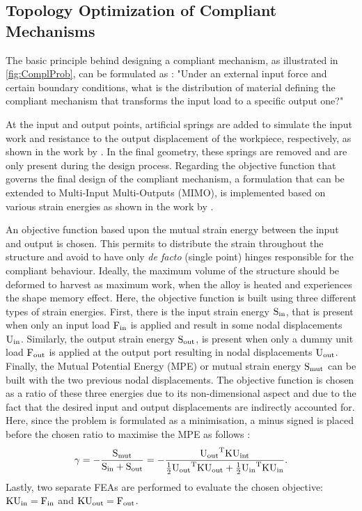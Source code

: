 \subsection{Topology Optimization of Compliant Mechanisms}
The basic principle behind designing a compliant mechanism, as illustrated in \cref{fig:ComplProb}, can be formulated as : "Under an external input force and certain boundary conditions, what is the distribution of material defining the compliant mechanism that transforms the input load to a specific output one?"

At the input and output points, artificial springs are added to simulate the input work and resistance to the output displacement of the workpiece, respectively, as shown in the work by \cite{alonsoTopologySynthesisMultiInput2014}. In the final geometry, these springs are removed and are only present during the design process. Regarding the objective function that governs the final design of the compliant mechanism, a formulation that can be extended to Multi-Input Multi-Outputs (MIMO), is implemented based on various strain energies as shown in the work by \cite{alonsoTopologySynthesisMultiInput2014}.

An objective function based upon the mutual strain energy between the input and output is chosen. This permits to distribute the strain throughout the structure and avoid to have only \textit{de facto} (single point) hinges responsible for the compliant behaviour. Ideally, the maximum volume of the structure should be deformed to harvest as maximum work, when the alloy is heated and experiences the shape memory effect. Here, the objective function is built using three different types of strain energies. First, there is the input strain energy $\text{S}_\text{in}$, that is present when only an input load $\text{F}_\text{in}$ is applied and result in some nodal displacements $\text{U}_\text{in}$. Similarly, the output strain energy $\text{S}_\text{out}$, is present when only a dummy unit load $\text{F}_\text{out}$ is applied at the output port resulting in nodal displacements $\text{U}_\text{out}$. Finally, the Mutual Potential Energy (MPE) or mutual strain energy $\text{S}_\text{mut}$ can be built with the two previous nodal displacements. The objective function is chosen as a ratio of these three energies due to its non-dimensional aspect and due to the fact that the desired input and output displacements are indirectly accounted for. Here, since the problem is formulated as a minimisation, a minus signed is placed before the chosen ratio to maximise the MPE as follows :
\begin{equation}
    \gamma = - \frac{\text{S}_\text{mut}}{\text{S}_\text{in} + \text{S}_\text{out}} = -\frac{{\text{U} _\text{out}}^\text{T} \text{K} \text{U}_\text{int}}{\frac{1}{2} {\text{U}_\text{out}}^\text{T} \text{K} \text{U}_\text{out} + \frac{1}{2} {\text{U}_\text{in}}^\text{T} \text{K} \text{U}_\text{in}}.
\end{equation}
Lastly, two separate FEAs are performed to evaluate the chosen objective: $\text{K} \text{U}_\text{in} = \text{F}_\text{in}$ and  $\text{K} \text{U}_\text{out} = \text{F}_\text{out}$.

